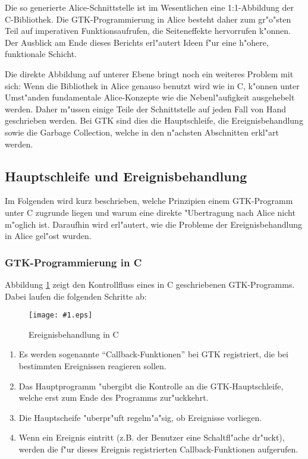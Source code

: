 \documentclass[a4paper,titlepage]{article}
\newcommand{\showimage}[1]{\begin{center}\texttt{[image: \#1.eps]}\end{center}}
\begin{document}
Die so generierte Alice-Schnittstelle ist im Wesentlichen
eine 1:1-Abbildung der C-Biblio\-thek. Die GTK-Programmierung in Alice
besteht daher zum gr"o"sten Teil auf imperativen Funktionsaufrufen, die
Seiteneffekte hervorrufen k"onnen.
Der Ausblick am Ende dieses Berichts erl"autert Ideen f"ur eine h"ohere,
funktionale Schicht.

Die direkte Abbildung auf unterer Ebene bringt noch ein weiteres Problem
mit sich: Wenn die Bibliothek in Alice genauso benutzt wird wie in C, 
k"onnen unter Umst"anden fundamentale Alice-Konzepte wie die Nebenl"aufigkeit
ausgehebelt werden. Daher m"ussen einige Teile der
Schnittstelle auf jeden Fall von Hand geschrieben werden.
Bei GTK sind dies die Hauptschleife, die Ereignisbehandlung sowie die
Garbage Collection, welche in den n"achsten Abschnitten erkl"art werden.

\subsection{Hauptschleife und Ereignisbehandlung}

Im Folgenden wird kurz beschrieben, welche Prinzipien einem GTK-Programm
unter C zugrunde liegen und warum eine direkte "Ubertragung nach Alice nicht
m"oglich ist. Daraufhin wird erl"autert, wie die Probleme der
Ereignisbehandlung in Alice gel"ost wurden.

\subsubsection*{GTK-Programmierung in C}

Abbildung \ref{EventsC} zeigt den Kontrollfluss eines in C
geschriebenen GTK-Programms. Dabei laufen die folgenden Schritte ab:
\begin{figure}
\showimage{events-c}
\caption{Ereignisbehandlung in C}
\label{EventsC}
\end{figure}

\begin{enumerate}
\item Es werden sogenannte ``Callback-Funktionen'' bei GTK registriert, die
      bei bestimmten Ereignissen reagieren sollen.
\item Das Hauptprogramm "ubergibt die Kontrolle an die GTK-Hauptschleife,
      welche erst zum Ende des Programms zur"uckkehrt.
\item Die Hauptscheife "uberpr"uft regelm"a"sig, ob Ereignisse vorliegen.
\item Wenn ein Ereignis eintritt (z.B. der Benutzer eine Schaltfl"ache 
      dr"uckt), werden die f"ur dieses Ereignis registrierten
      Callback-Funktionen aufgerufen.
\end{enumerate}
\end{document}
